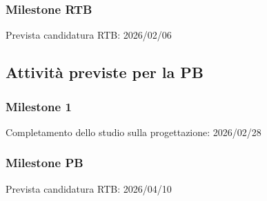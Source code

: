 \documentclass[a4paper,12pt]{article}
\begin{document}
\subsubsection*{Milestone RTB}
Prevista candidatura RTB: 2026/02/06 


\subsection{Attività previste per la PB}

\subsubsection*{Milestone 1}
Completamento dello studio sulla progettazione: 2026/02/28

\subsubsection*{Milestone PB}
Prevista candidatura RTB: 2026/04/10 

\renewcommand{\arraystretch}{1.2}
\end{document}
